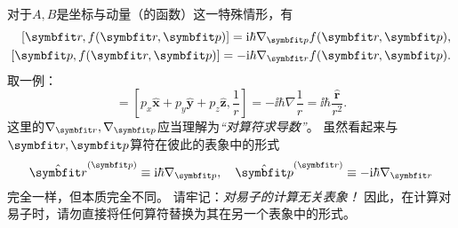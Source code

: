 对于$A,B$是坐标与动量（的函数）这一特殊情形，有
\begin{equation}
\begin{aligned}
    \relax
    [\rr, f(\rr,\pp)] = \ii\hbar\nabla_{\pp} f(\rr,\pp), \\
    [\pp, f(\rr,\pp)] = -\ii\hbar\nabla_{\rr} f(\rr,\pp).
\end{aligned}
\end{equation}
取一例：
\begin{equation}
    [\pp, \frac{1}{r}] = [p_x \hat{\bm{x}} + p_y \hat{\bm{y}} + p_z \hat{\bm{z}}, \frac{1}{r}] = -\ii\hbar \nabla \frac{1}{r} = \ii\hbar \frac{\hat{\bm{r}}}{r^2}.
\end{equation}
这里的$\nabla_{\rr}, \nabla_{\pp}$应当理解为\emph{``对算符求导数''}。
虽然看起来与$\rr,\pp$算符在彼此的表象中的形式
\begin{equation}
    \hat{\rr}^{(\pp)}\equiv\ii\hbar\nabla_{\pp},
    \quad \hat{\pp}^{(\rr)}\equiv-\ii\hbar\nabla_{\rr}
\end{equation}
完全一样，但本质完全不同。
请牢记：\emph{对易子的计算无关表象！}
因此，在计算对易子时，请勿直接将任何算符替换为其在另一个表象中的形式。
